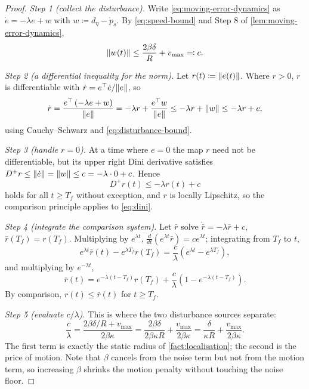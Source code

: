 \documentclass[11pt,a4paper]{article}
\theoremstyle{plain}
\theoremstyle{definition}
\DeclarePairedDelimiter{\norm}{\lVert}{\rVert}
\begin{document}
\begin{proof}
\emph{Step 1 (collect the disturbance).} Write \eqref{eq:moving-error-dynamics} as
$\dot e=-\lambda e+w$ with $w\coloneqq d_\eta-\dot p_s$. By \eqref{eq:speed-bound} and Step 8 of
\cref{lem:moving-error-dynamics},
\begin{equation}\label{eq:disturbance-bound}
    \norm{w(t)}\leq\frac{2\beta\delta}{R}+v_{\max}\eqqcolon c .
\end{equation}

\emph{Step 2 (a differential inequality for the norm).} Let $r(t)\coloneqq\norm{e(t)}$. Where
$r>0$, $r$ is differentiable with $\dot r=e^{\top}\dot e/\norm{e}$, so
\begin{equation*}
    \dot r=\frac{e^{\top}\left(-\lambda e+w\right)}{\norm{e}}
    =-\lambda r+\frac{e^{\top}w}{\norm{e}}
    \leq-\lambda r+\norm{w}
    \leq-\lambda r+c,
\end{equation*}
using Cauchy--Schwarz and \eqref{eq:disturbance-bound}.

\emph{Step 3 (handle $r=0$).} At a time where $e=0$ the map $r$ need not be differentiable, but
its upper right Dini derivative satisfies
$D^+r\leq\norm{\dot e}=\norm{w}\leq c=-\lambda\cdot0+c$. Hence
\begin{equation}\label{eq:dini}
    D^+r(t)\leq-\lambda r(t)+c
\end{equation}
holds for all $t\geq T_f$ without exception, and $r$ is locally Lipschitz, so the comparison
principle applies to \eqref{eq:dini}.

\emph{Step 4 (integrate the comparison system).} Let $\bar r$ solve
$\dot{\bar r}=-\lambda\bar r+c$, $\bar r(T_f)=r(T_f)$. Multiplying by $e^{\lambda t}$,
$\frac{d}{dt}\left(e^{\lambda t}\bar r\right)=ce^{\lambda t}$; integrating from $T_f$ to $t$,
\begin{equation*}
    e^{\lambda t}\bar r(t)-e^{\lambda T_f}r(T_f)
    =\frac{c}{\lambda}\left(e^{\lambda t}-e^{\lambda T_f}\right),
\end{equation*}
and multiplying by $e^{-\lambda t}$,
\begin{equation}\label{eq:comparison-solution}
    \bar r(t)=e^{-\lambda(t-T_f)}r(T_f)
    +\frac{c}{\lambda}\left(1-e^{-\lambda(t-T_f)}\right).
\end{equation}
By comparison, $r(t)\leq\bar r(t)$ for $t\geq T_f$.

\emph{Step 5 (evaluate $c/\lambda$).} This is where the two disturbance sources separate:
\begin{equation}\label{eq:c-over-lambda}
    \frac{c}{\lambda}
    =\frac{2\beta\delta/R+v_{\max}}{2\beta\kappa}
    =\frac{2\beta\delta}{2\beta\kappa R}+\frac{v_{\max}}{2\beta\kappa}
    =\frac{\delta}{\kappa R}+\frac{v_{\max}}{2\beta\kappa}.
\end{equation}
The first term is exactly the static radius of \cref{fact:localisation}; the second is the price
of motion. Note that $\beta$ cancels from the noise term but not from the motion term, so
increasing $\beta$ shrinks the motion penalty without touching the noise floor.


\end{proof}
\end{document}

